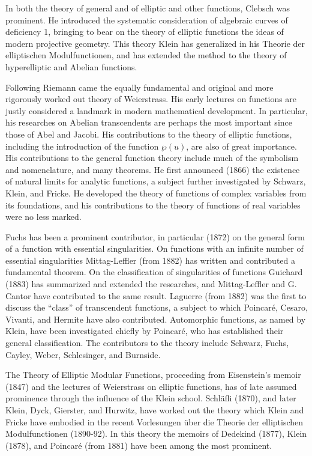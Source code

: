 \documentclass[oneside]{book}
\begin{document}
In both the theory of general and of elliptic and other functions,
Clebsch was prominent. He introduced the systematic consideration
of algebraic curves of deficiency 1, bringing to bear on the theory
of elliptic functions the ideas of modern projective geometry. This
theory Klein has generalized in his Theorie der elliptischen
Modulfunctionen, and has extended the method to the theory of
hyperelliptic and Abelian functions.

Following Riemann came the equally fundamental and original and more
rigorously worked out theory of Weierstrass. His early lectures on
functions are justly considered a landmark in modern mathematical
development. In particular, his researches on Abelian transcendents
are perhaps the most important since those of Abel and Jacobi. His
contributions to the theory of elliptic functions, including the
introduction of the function $\wp(u)$, are also of great
importance. His contributions to the general function theory
include much of the symbolism and nomenclature, and many
theorems. He first announced (1866) the existence of natural limits
for analytic functions, a subject further investigated by Schwarz,
Klein, and Fricke. He developed the theory of functions of complex
variables from its foundations, and his contributions to the theory
of functions of real variables were no less marked.

Fuchs has been a prominent contributor, in particular (1872) on the
general form of a function with essential singularities. On
functions with an infinite number of essential singularities
Mittag-Leffler (from 1882) has written and contributed a fundamental
theorem. On the classification of singularities of functions
Guichard (1883) has summarized and extended the researches, and
Mittag-Leffler and G. Cantor have contributed to the same
result. Laguerre (from 1882) was the first to discuss the ``class''
of transcendent functions, a subject to which Poincar\'e, Cesaro,
Vivanti, and Hermite have also contributed. Automorphic functions,
as named by Klein, have been investigated chiefly by Poincar\'e, who
has established their general classification. The contributors to
the theory include Schwarz, Fuchs, Cayley, Weber, Schlesinger, and
Burnside.

The Theory of Elliptic Modular Functions, proceeding from
Eisenstein's memoir (1847) and the lectures of Weierstrass on
elliptic functions, has of late assumed prominence through the
influence of the Klein school. Schl\"afli (1870), and later Klein,
Dyck, Gierster, and Hurwitz, have worked out the theory which Klein
and Fricke have embodied in the recent Vorlesungen
\"uber die Theorie der elliptischen Modulfunctionen
(1890-92). In this theory the memoirs of Dedekind (1877), Klein
(1878), and Poincar\'e (from 1881) have been among the most
prominent.
\end{document}
